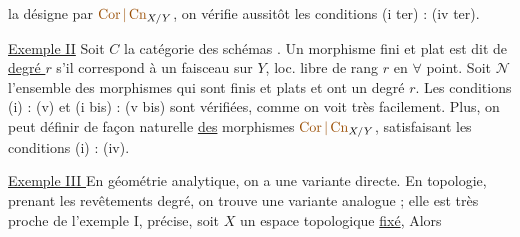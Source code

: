 la désigne par $\unsure{\operatorname{Cor}|\operatorname{Cn}}_{X/Y}$, on vérifie aussitôt les conditions (i ter) : (iv ter).


\uline{Exemple II} Soit $C$ la catégorie des schémas . Un morphisme fini et plat  est dit de \uline{degré $r$} s'il correspond à un  faisceau    sur $Y$, loc. libre de  rang $r$ en $\forall$ point. Soit $\mathcal N$ l'ensemble des morphismes qui sont finis et plats et ont un  degré $r$. Les conditions (i) : (v) et (i bis) : (v bis) sont vérifiées, comme on voit  très facilement.  Plus, on peut définir de façon naturelle \uline{des}  morphismes $\unsure{\operatorname{Cor}|\operatorname{Cn}}_{X/Y}$, satisfaisant les conditions (i) : (iv).

\uline{Exemple III }  En géométrie analytique, on a une variante directe. En topologie, prenant les revêtements    degré, on trouve une variante analogue ; elle est très proche de l'exemple I,   précise, soit $X$ un espace topologique \uline{fixé},  Alors
